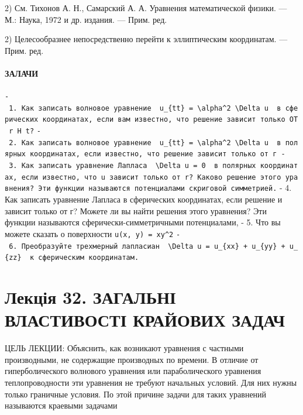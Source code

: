 \documentclass[
  ukrainian,
]{article}
\begin{document}
2) См. Тихонов А. Н., Самарский А. А. Уравнения математической физики.
--- М.: Наука, 1972 и др. издания. --- Прим. ред.

2) Целесообразнее непосредственно перейти к эллиптическим координатам.
--- Прим. ред.

\paragraph{ЗАЛАЧИ}\label{ux437ux430ux43bux430ux447ux438}

\texttt{-\ 1.\ Как\ записать\ волновое\ уравнение\ \ \textquotesingle{}u\_\{tt\}\ =\ \textbackslash{}alpha\^{}2\ \textbackslash{}Delta\ u\textquotesingle{}\ \ в\ сферических\ координатах,\ если\ вам\ известно,\ что\ решение\ зависит\ только\ OT\ r\ H\ t?}
\texttt{-\ 2.\ Как\ записать\ волновое\ уравнение\ \ \textquotesingle{}u\_\{tt\}\ =\ \textbackslash{}alpha\^{}2\ \textbackslash{}Delta\ u\textquotesingle{}\ \ в\ полярных\ координатах,\ если\ известно,\ что\ решение\ зависит\ только\ от\ г\ -\ 3.\ Как\ записать\ уравнение\ Лапласа\ \ \textquotesingle{}\textbackslash{}Delta\ u\ =\ 0\textquotesingle{}\ \ в\ полярных\ координатах,\ если\ известно,\ что\ u\ зависит\ только\ от\ r?\ Каково\ решение\ этого\ уравнения?\ Эти\ функции\ называются\ потенциалами\ с\textquotesingle{}криговой\ симметрией.}
- 4. Как записать уравнение Лапласа в сферических координатах, если
решение и зависит только от г? Можете ли вы найти решения этого
уравнения? Эти функции называются сферически-симметричными потенциалами,
- 5. Что вы можете сказать о поверхности \texttt{u(x,\ y)\ =\ xy\^{}2}
\texttt{-\ 6.\ Преобразуйте\ трехмерный\ лапласиан\ \ \textquotesingle{}\textbackslash{}Delta\ u\ =\ u\_\{xx\}\ +\ u\_\{yy\}\ +\ u\_\{zz\}\textquotesingle{}\ \ к\ сферическим\ координатам.}

\section{Лекція 32. ЗАГАЛЬНІ ВЛАСТИВОСТІ КРАЙОВИХ
ЗАДАЧ}\label{ux43bux435ux43aux446ux456ux44f-32.-ux437ux430ux433ux430ux43bux44cux43dux456-ux432ux43bux430ux441ux442ux438ux432ux43eux441ux442ux456-ux43aux440ux430ux439ux43eux432ux438ux445-ux437ux430ux434ux430ux447}

ЦЕЛЬ ЛЕКЦИИ: Объяснить, как возникают уравнения с частными производными,
не содержащие производных по времени. В отличие от гиперболического
волнового уравнения или параболического уравнения теплопроводности эти
уравнения не требуют начальных условий. Для них нужны только граничные
условия. По этой причине задачи для таких уравнений называются краевыми
задачами
\end{document}
